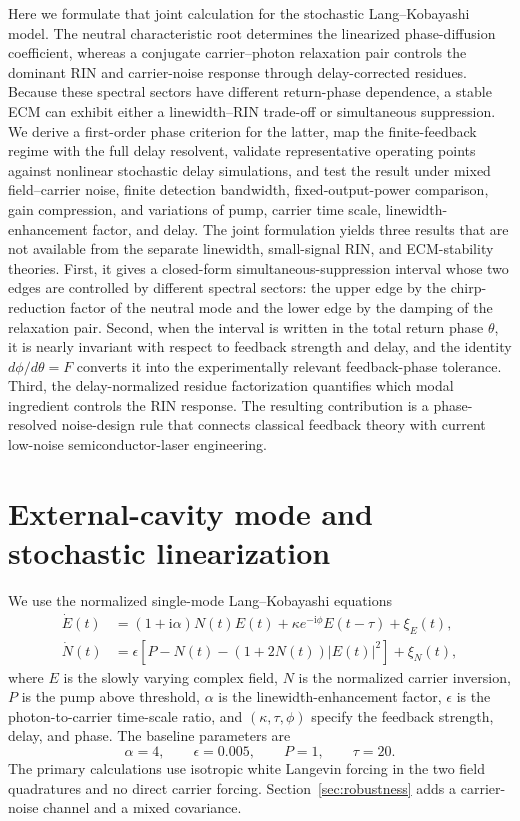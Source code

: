 \documentclass{optica-article}
\newif\ifmarked
\newcommand{\rev}[1]{\ifmarked{\color{blue}#1}\else#1\fi}
\newcommand{\ii}{\mathrm{i}}
\begin{document}
Here we formulate that joint calculation for the stochastic Lang--Kobayashi model. The neutral characteristic root determines the linearized phase-diffusion coefficient, whereas a conjugate carrier--photon relaxation pair controls the dominant RIN and carrier-noise response through delay-corrected residues. Because these spectral sectors have different return-phase dependence, a stable ECM can exhibit either a linewidth--RIN trade-off or simultaneous suppression. We derive a first-order phase criterion for the latter, map the finite-feedback regime with the full delay resolvent, validate representative operating points against nonlinear stochastic delay simulations, and test the result under mixed field--carrier noise, finite detection bandwidth, fixed-output-power comparison, gain compression, and variations of pump, carrier time scale, linewidth-enhancement factor, and delay. \rev{The joint formulation yields three results that are not available from the separate linewidth, small-signal RIN, and ECM-stability theories. First, it gives a closed-form simultaneous-suppression interval whose two edges are controlled by different spectral sectors: the upper edge by the chirp-reduction factor of the neutral mode and the lower edge by the damping of the relaxation pair. Second, when the interval is written in the total return phase $\theta$, it is nearly invariant with respect to feedback strength and delay, and the identity $d\phi/d\theta=F$ converts it into the experimentally relevant feedback-phase tolerance. Third, the delay-normalized residue factorization quantifies which modal ingredient controls the RIN response.} The resulting contribution is a phase-resolved noise-design rule that connects classical feedback theory with current low-noise semiconductor-laser engineering.

\section{External-cavity mode and stochastic linearization}

We use the normalized single-mode Lang--Kobayashi equations
\begin{align}
 \dot E(t)&=(1+\ii\alpha)N(t)E(t)+\kappa e^{-\ii\phi}E(t-\tau)+\xi_E(t), \label{eq:LKfield}\\
 \dot N(t)&=\epsilon\left[P-N(t)-(1+2N(t))|E(t)|^2\right]+\xi_N(t), \label{eq:LKcarrier}
\end{align}
where $E$ is the slowly varying complex field, $N$ is the normalized carrier inversion, $P$ is the pump above threshold, $\alpha$ is the linewidth-enhancement factor, $\epsilon$ is the photon-to-carrier time-scale ratio, and $(\kappa,\tau,\phi)$ specify the feedback strength, delay, and phase. The baseline parameters are
\begin{equation}
 \alpha=4,\qquad \epsilon=0.005,\qquad P=1,\qquad \tau=20.
 \label{eq:parameters}
\end{equation}
The primary calculations use isotropic white Langevin forcing in the two field quadratures and no direct carrier forcing. Section~\ref{sec:robustness} adds a carrier-noise channel and a mixed covariance.
\end{document}
